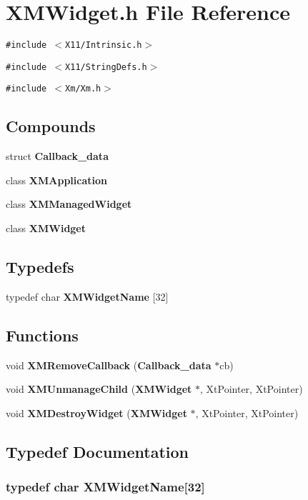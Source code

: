 \section{XMWidget.h File Reference}
\label{XMWidget_8h}
{\tt \#include $<$X11/Intrinsic.h$>$}\par
{\tt \#include $<$X11/String\-Defs.h$>$}\par
{\tt \#include $<$Xm/Xm.h$>$}\par
\subsection*{Compounds}
\begin{CompactItemize}
\item 
struct {\bf Callback\_\-data}
\item 
class {\bf XMApplication}
\item 
class {\bf XMManaged\-Widget}
\item 
class {\bf XMWidget}
\end{CompactItemize}
\subsection*{Typedefs}
\begin{CompactItemize}
\item 
typedef char {\bf XMWidget\-Name} [32]
\end{CompactItemize}
\subsection*{Functions}
\begin{CompactItemize}
\item 
void {\bf XMRemove\-Callback} ({\bf Callback\_\-data} $\ast$cb)
\item 
void {\bf XMUnmanage\-Child} ({\bf XMWidget} $\ast$, Xt\-Pointer, Xt\-Pointer)
\item 
void {\bf XMDestroy\-Widget} ({\bf XMWidget} $\ast$, Xt\-Pointer, Xt\-Pointer)
\end{CompactItemize}


\subsection{Typedef Documentation}
\subsubsection{\setlength{\rightskip}{0pt plus 5cm}typedef char XMWidget\-Name[32]}\label{XMWidget_8h_a0}




